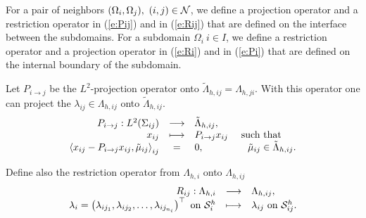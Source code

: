 For a pair of neighbors $(\Omega_i, \Omega_j), \ (i,j) \in {\mathcal N}_{}$, we define a
projection operator and a restriction operator in (\ref{e:Pij}) and in
(\ref{e:Rij}) that are defined on the interface between the subdomains. For a
subdomain $\Omega_i \ i \in I$, we define a restriction operator and a
projection operator in (\ref{e:Ri}) and in (\ref{e:Pi}) that are defined on the
internal boundary of the subdomain.

Let $P_{i\rightarrow j}$ be the $L^2$-projection operator onto $\tilde
\Lambda_{h,ij} = \Lambda_{h,ji}$. With this operator one can project the
$\lambda_{ij} \in \Lambda_{h,ij}$ onto $\tilde \Lambda_{h,ij}$.
\begin{equation}  \label{e:Pij}\begin{array}{rcll}
P_{i\rightarrow j} : L^2(\Sigma_{ij}) & \longrightarrow &  \tilde \Lambda_{h,ij}, \\
\displaystyle  x_{ij} & \longmapsto & P_{i\rightarrow j} x_{ij} & \mbox{ such that } \\
\left< x_{ij} -  P_{i\rightarrow j} x_{ij}, \tilde \mu_{ij} \right>_{ij} 
& = & 0, & \quad \tilde \mu_{ij} \in  \tilde \Lambda_{h,ij}.
\end{array}\end{equation}


Define also the restriction operator from $\Lambda_{h,i}$ onto $\Lambda_{h,ij}$
\begin{equation} \label{e:Rij}\begin{array}{rcll}
  R_{ij}: \Lambda_{h,i} & \longrightarrow &  \Lambda_{h,ij}, \\
\lambda_i = \left(  \lambda_{ij_1}, 
      \lambda_{ij_2}, 
      \ldots,
      \lambda_{ij_{n_i}}
  \right)^{\top} 
 \mbox{ on } \mathcal{S}^{h}_{i}  &  \longmapsto & \lambda_{ij} \mbox{ on } \mathcal{S}^{h}_{ij}.
\end{array}\end{equation}

